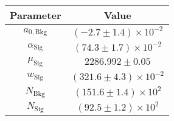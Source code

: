 \begin{tabular}{cc}
  \toprule
  Parameter & Value \\
  \midrule
$a_{0,\mathrm{Bkg}}$ & $(-2.7 \pm 1.4) \times 10^{-2}$ \\
$\alpha_{\mathrm{Sig}}$ & $(74.3 \pm 1.7) \times 10^{-2}$ \\
$\mu_{\mathrm{Sig}}$ & $2286.992 \pm 0.05$ \\
$w_{\mathrm{Sig}}$ & $(321.6 \pm 4.3) \times 10^{-2}$ \\
$N_{\mathrm{Bkg}}$ & $(151.6 \pm 1.4) \times 10^{2}$ \\
$N_{\mathrm{Sig}}$ & $(92.5 \pm 1.2) \times 10^{2}$ \\
  \bottomrule
\end{tabular}
